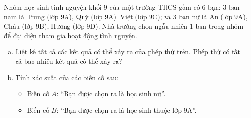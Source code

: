 \begin{bt}%
Nhóm học sinh tình nguyện khối 9 của một trường THCS gồm có $6$ bạn: $3$ bạn nam là Trung (lớp 9A), Quý (lớp 9A), Việt (lớp 9C); và $3$ bạn nữ là An (lớp 9A), Châu (lớp 9B), Hương (lớp 9D). Nhà trường chọn ngẫu nhiên $1$ bạn trong nhóm để đại diện tham gia hoạt động tình nguyện.
\begin{enumerate}[a)]
	\item Liệt kê tất cả các kết quả có thể xảy ra của phép thử trên. Phép thử có tất cả bao nhiêu kết quả có thể xảy ra?
	\item Tính xác suất của các biến cố sau:
	\begin{itemize}
		\item Biến cố $A$: ``Bạn được chọn ra là học sinh nữ''.
		\item Biến cố $B$: ``Bạn được chọn ra là học sinh thuộc lớp 9A''.
	\end{itemize}
\end{enumerate}
\end{bt}

